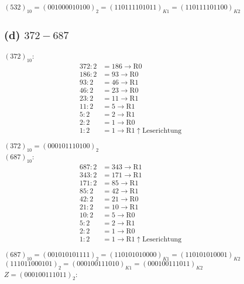 \documentclass[11pt,a4paper]{article}
\begin{document}
$(532)_{10} = (001000010100)_2 = (110111101011)_{K1} = (110111101100)_{K2}$

\newpage
\subsection*{(d) $372-687$}

$(372)_{10}$:
\begin{align*}
    372:2 &= 186 \rightarrow \mbox{R}0 \\
    186:2 &= 93 \rightarrow \mbox{R}0 \\
    93:2 &= 46  \rightarrow \mbox{R}1 \\
    46:2 &= 23   \rightarrow \mbox{R}0 \\
    23:2 &= 11   \rightarrow \mbox{R}1 \\
    11:2 &= 5   \rightarrow \mbox{R}1 \\
    5:2 &= 2   \rightarrow \mbox{R}1 \\
    2:2 &= 1   \rightarrow \mbox{R}0 \\
    1:2 &= 1   \rightarrow \mbox{R}1 \uparrow \mbox{Leserichtung}
\end{align*}

$(372)_{10} = (000101110100)_2$\\

$(687)_{10}$:
\begin{align*}
    687:2 &= 343 \rightarrow \mbox{R}1 \\
    343:2 &= 171 \rightarrow \mbox{R}1 \\
    171:2 &= 85  \rightarrow \mbox{R}1 \\
    85:2 &= 42   \rightarrow \mbox{R}1 \\
    42:2 &= 21   \rightarrow \mbox{R}0 \\
    21:2 &= 10   \rightarrow \mbox{R}1 \\
    10:2 &= 5   \rightarrow \mbox{R}0 \\
    5:2 &= 2   \rightarrow \mbox{R}1 \\
    2:2 &= 1   \rightarrow \mbox{R}0 \\
    1:2 &= 1   \rightarrow \mbox{R}1 \uparrow \mbox{Leserichtung}
\end{align*}

$(687)_{10} = (001010101111)_2 = (110101010000)_{K1} = (110101010001)_{K2}$\\
$(111011000101)_2 = (000100111010)_{K1} = (000100111011)_{K2}$ \\

$Z = (000100111011)_2$:
\end{document}
